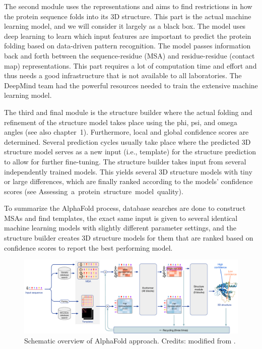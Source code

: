 The second module uses the representations and aims to find restrictions in how the protein sequence folds into its 3D structure.
This part is the actual machine learning model, and we will consider it largely as a black box.
The model uses deep learning to learn which input features are important to predict the protein folding based on data-driven pattern recognition.
The model passes information back and forth between the sequence-residue (MSA) and residue-residue (contact map) representations.
This part requires a lot of computation time and effort and thus needs a good infrastructure that is not available to all laboratories.
The DeepMind team had the powerful resources needed to train the extensive machine learning model.

The third and final module is the structure builder where the actual folding and refinement of the structure model takes place using the phi, psi, and omega angles (see also chapter~1).
Furthermore, local and global confidence scores are determined.
Several prediction cycles usually take place where the predicted 3D structure model serves as a new input (i.e., template) for the structure prediction to allow for further fine-tuning.
The structure builder takes input from several independently trained models.
This yields several 3D structure models with tiny or large differences, which are finally ranked according to the models' confidence scores (see Assessing~a~protein~structure~model~quality).

To summarize the AlphaFold process, database searches are done to construct MSAs and find templates, the exact same input is given to several identical machine learning models with slightly different parameter settings, and the structure builder creates 3D structure models for them that are ranked based on confidence scores to report the best performing model.

\begin{figure}[!htbp]
\centering
\includegraphics[width=0.7\linewidth]{files/alphafold-approach-4511e2180a32727cd445303388eeed93.png}
\caption[]{Schematic overview of AlphaFold approach.
Credits: modified from \cite{alphafold_approach_2021}.}
\label{alphafold_approach}
\end{figure}

